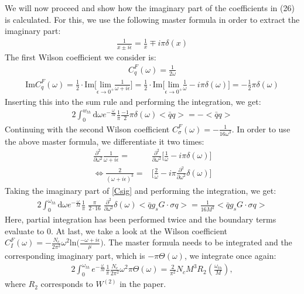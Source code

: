 \documentclass[openright,twoside,12pt,a4paper,final]{article}
\begin{document}
	We will now proceed and show how the imaginary part of the coefficients in (26) is calculated. For this, we use the following master formula in order to extract the imaginary part:
	\begin{align}
		\frac{1}{x \pm i \epsilon} = \frac{1}{x} \mp i \pi \delta(x)
	\end{align}
	The first Wilson coefficient we consider is:
	\begin{align}
		C_q^F (\omega) = \frac{1}{2 \omega}
	\end{align}
	\begin{align}
		\mathrm{Im} C_q^F(\omega) = \frac{1}{2} \cdot  \mathrm{Im} \bigg[\underset{\epsilon \rightarrow 0^+}{\mathrm{lim}} \frac{1}{\omega + i \epsilon}\bigg] = \frac{1}{2} \cdot  \mathrm{Im} \bigg[\underset{\epsilon \rightarrow 0^+}{\mathrm{lim}} \frac{1}{\omega} - i \pi \delta(\omega) \bigg] = -\frac{1}{2} \pi \delta(\omega)
	\end{align} 
	Inserting this into the sum rule and performing the integration, we get:
	\begin{align}
		2 \int_0^{w_{th}} \mathrm{d} \omega e^{-\frac{\omega}{M}} \frac{1}{\pi} \frac{-1}{2} \pi \delta(\omega) <\bar{q}q> = - < \bar{q} q>
	\end{align}
	Continuing with the second Wilson coefficient $C_{\sigma}^F (\omega) = - \frac{1}{16 \omega^3}$. In order to use the above master formula, we differentiate it two times:
	\begin{align}
		\frac{\partial^2}{\partial \omega^2} \frac{1}{\omega + i \epsilon} =& \frac{\partial^2}{\partial \omega^2} \bigg[\frac{1}{\omega} - i \pi \delta(\omega)\bigg] \\ \Leftrightarrow  \frac{2}{(\omega + i \epsilon)^3} =& \bigg[\frac{2}{\omega} - i \pi \frac{\partial^2}{\partial \omega^2} \delta(\omega)\bigg] \label{Csig}
	\end{align}
	Taking the imaginary part of \eqref{Csig} and performing the integration, we get:
	\begin{align}
		2 \int_0^{\omega_{th}} \mathrm{d} \omega e^{-\frac{\omega}{M}} \frac{1}{\pi} \; \frac{\pi}{2\cdot 16} \; \frac{\partial^2}{\partial \omega^2} \delta(\omega) < \bar{q} g_s G \cdot \sigma q> = \frac{1}{16M^2} < \bar{q} g_s G \cdot \sigma q>
	\end{align}
	Here, partial integration has been performed twice and the boundary terms evaluate to $0$.
	At last, we take a look at the Wilson coefficient $C_I^F (\omega) = - \frac{N_c}{2 \pi^2} \omega^2 \mathrm{ln}\bigg(\frac{-\omega + i \epsilon}{\mu}\bigg)$.  The master formula needs to be integrated and the corresponding imaginary part, which is $- \pi \Theta(\omega)$, we integrate once again:
	\begin{align}
		2 \int_0^{\omega_{th}} e^{-\frac{\omega}{M}} \frac{1}{\pi} \frac{N_c}{2 \pi^2} \omega^2 \pi \Theta(\omega) = \frac{2}{\pi^2} N_c M^3 R_2(\frac{\omega_{th}}{M}),
	\end{align}
	where $R_2$ corresponds to $W^{(2)}$ in the paper.
\end{document}
